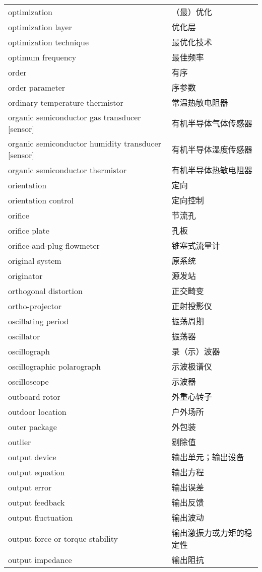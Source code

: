 \documentclass[
]{article}
\begin{document}
\begin{longtable}[]{@{}ll@{}}
optimization & （最）优化 \\
optimization layer & 优化层 \\
optimization technique & 最优化技术 \\
optimum frequency & 最佳频率 \\
order & 有序 \\
order parameter & 序参数 \\
ordinary temperature thermistor & 常温热敏电阻器 \\
organic semiconductor gas transducer {[}sensor{]} &
有机半导体气体传感器 \\
organic semiconductor humidity transducer {[}sensor{]} &
有机半导体湿度传感器 \\
organic semiconductor thermistor & 有机半导体热敏电阻器 \\
orientation & 定向 \\
orientation control & 定向控制 \\
orifice & 节流孔 \\
orifice plate & 孔板 \\
orifice-and-plug flowmeter & 锥塞式流量计 \\
original system & 原系统 \\
originator & 源发站 \\
orthogonal distortion & 正交畸变 \\
ortho-projector & 正射投影仪 \\
oscillating period & 振荡周期 \\
oscillator & 振荡器 \\
oscillograph & 录（示）波器 \\
oscillographic polarograph & 示波极谱仪 \\
oscilloscope & 示波器 \\
outboard rotor & 外重心转子 \\
outdoor location & 户外场所 \\
outer package & 外包装 \\
outlier & 剔除值 \\
output device & 输出单元；输出设备 \\
output equation & 输出方程 \\
output error & 输出误差 \\
output feedback & 输出反馈 \\
output fluctuation & 输出波动 \\
output force or torque stability & 输出激振力或力矩的稳定性 \\
output impedance & 输出阻抗 \\

\end{longtable}
\end{document}
